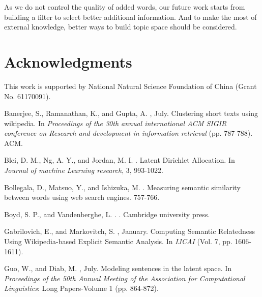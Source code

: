 \documentclass[11pt]{article}
\begin{document}
As we do not control the quality of added words, our future work starts from building a filter to select better additional information. And to make the most of external knowledge, better ways to build topic space should be considered.

\section*{Acknowledgments}

This work is supported by National Natural Science Foundation of China (Grant No. 61170091).


\begin{thebibliography}{}

Banerjee, S., Ramanathan, K., and Gupta, A.
, July.
\newblock Clustering short texts using wikipedia.
\newblock In {\em Proceedings of the 30th annual international ACM SIGIR conference on Research and development in information retrieval} (pp. 787-788). ACM.

Blei, D. M., Ng, A. Y., and Jordan, M. I.
.
\newblock Latent Dirichlet Allocation.
\newblock In {\em Journal of machine Learning research}, 3, 993-1022.

Bollegala, D., Matsuo, Y., and Ishizuka, M.
.
\newblock Measuring semantic similarity between words using web search engines.
 757-766.

Boyd, S. P., and Vandenberghe, L.
.
.
\newblock Cambridge university press.

Gabrilovich, E., and Markovitch, S.
, January.
\newblock Computing Semantic Relatedness Using Wikipedia-based Explicit Semantic Analysis.
\newblock In {\em IJCAI} (Vol. 7, pp. 1606-1611).

Guo, W., and Diab, M.
, July.
\newblock Modeling sentences in the latent space.
\newblock In {\em Proceedings of the 50th Annual Meeting of the Association for Computational Linguistics}: Long Papers-Volume 1 (pp. 864-872).


\end{thebibliography}
\end{document}
